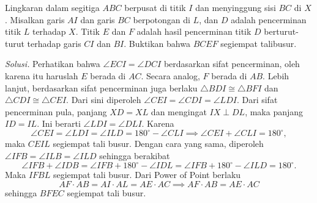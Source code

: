 \documentclass[12pt]{scrartcl}
\newcommand{\siku}[4][.21cm]
	{
	\coordinate (tempa) at ($(#3)!#1!(#2)$);
	\coordinate (tempb) at ($(#3)!#1!(#4)$);
	\coordinate (tempc) at ($(tempa)!0.5!(tempb)$);%
	\draw[black] (tempa) -- ($(#3)!2!(tempc)$) -- (tempb);
	}
\begin{document}
\newpage
\begin{tcolorbox}[title=\textbf{Soal 2: OSN SL 2014/G1}]
Lingkaran dalam segitiga $ABC$ berpusat di titik $I$ dan menyinggung sisi $BC$ di $X$. Misalkan garis $AI$ dan garis $BC$ berpotongan di $L$, dan $D$ adalah pencerminan titik $L$ terhadap $X$. Titik $E$ dan $F$ adalah hasil pencerminan titik $D$ berturut-turut terhadap garis $CI$ dan $BI$. Buktikan bahwa $BCEF$ segiempat talibusur. 
\end{tcolorbox}
\noindent\textit{Solusi.} Perhatikan bahwa $\angle ECI=\angle DCI$ berdasarkan sifat pencerminan, oleh karena itu haruslah $E$ berada di $AC$. Secara analog, $F$ berada di $AB$. Lebih lanjut, berdasarkan sifat pencerminan juga berlaku $\triangle BDI\cong \triangle BFI$ dan $\triangle CDI\cong \triangle CEI$. Dari sini diperoleh $\angle CEI=\angle CDI=\angle LDI$. Dari sifat pencerminan pula, panjang $XD=XL$ dan mengingat $IX\;\bot\;DL$, maka panjang $ID=IL$. Ini berarti $\angle LDI=\angle DLI$. Karena
\[\angle CEI = \angle LDI = \angle ILD = 180^\circ-\angle CLI\implies \angle CEI+\angle CLI = 180^\circ,\]
maka $CEIL$ segiempat tali busur. Dengan cara yang sama, diperoleh $\angle IFB = \angle ILB = \angle ILD$ sehingga berakibat
\[\angle IFB + \angle IDB = \angle IFB + 180^\circ - \angle IDL =\angle IFB + 180^\circ - \angle ILD =180^\circ.\]
Maka $IFBL$ segiempat tali busur. Dari Power of Point berlaku
\[AF\cdot AB = AI\cdot AL = AE\cdot AC\implies AF\cdot AB = AE\cdot AC\]
sehingga $BFEC$ segiempat tali busur.
\begin{center}
\end{center}
\end{document}
